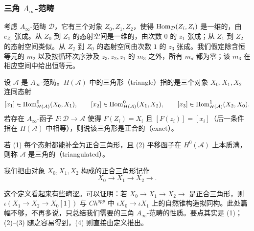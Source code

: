 \subsubsection*{三角 $A_\infty$-范畴}

考虑 $A_\infty$-范畴 $\mathcal{D}$，它有三个对象 $Z_0,Z_1,Z_2$，使得 $\operatorname{Hom}_{\mathcal{D}}(Z_i,Z_i)$ 是一维的，由 $e_{Z_i}$ 张成。从 $Z_0$ 到 $Z_1$ 的态射空间是一维的，由次数 $0$ 的 $z_1$ 张成；从 $Z_1$ 到 $Z_2$ 的态射空间类似。从 $Z_2$ 到 $Z_0$ 的态射空间由次数 $1$ 的 $z_3$ 张成。我们假定除含恒等元的 $m_2$ 以及按循环次序涉及 $z_3,z_2,z_1$ 的 $m_3$ 之外，所有 $m_d$ 都为零；该 $m_3$ 在相应空间中给出恒等元。

\begin{definition*}
设 $\mathcal{A}$ 是 $A_\infty$-范畴。$H(\mathcal{A})$ 中的三角形（triangle）指的是三个对象 $X_0,X_1,X_2$ 连同态射
\[
[x_1]\in\operatorname{Hom}^0_{H(\mathcal{A})}(X_0,X_1),\qquad
[x_2]\in\operatorname{Hom}^0_{H(\mathcal{A})}(X_1,X_2),\qquad
[x_3]\in\operatorname{Hom}^1_{H(\mathcal{A})}(X_2,X_0).
\]
若存在 $A_\infty$-函子 $F\colon\mathcal{D}\to\mathcal{A}$ 使得 $F(Z_i)=X_i$ 且 $[F(z_i)]=[x_i]$（后一条件指在 $H(\mathcal{A})$ 中相等），则说该三角形是正合的（exact）。

若 (1) 每个态射都能补全为正合三角形，且 (2) 平移函子在 $H^0(\mathcal{A})$ 上本质满，则称 $\mathcal{A}$ 是三角的（triangulated）。
\end{definition*}


我们把由对象 $X_0,X_1,X_2$ 构成的正合三角形记作
\[
X_0\to X_1\to X_2\to .
\]


这个定义看起来有些晦涩。可以证明：若 $X_0\to X_1\to X_2\to$ 是正合三角形，则 $\iota(X_1\to X_2\to X_0[1])$ 与 $Ch^{opp}$ 中 $\iota X_0\to\iota X_1$ 上的自然锥构造拟同构。此处篇幅不够，不再多说，只总结我们需要的三角 $A_\infty$-范畴的性质。要点其实是 (1)；(2)–(3) 随之容易得到，(4) 则直接由定义推出。

